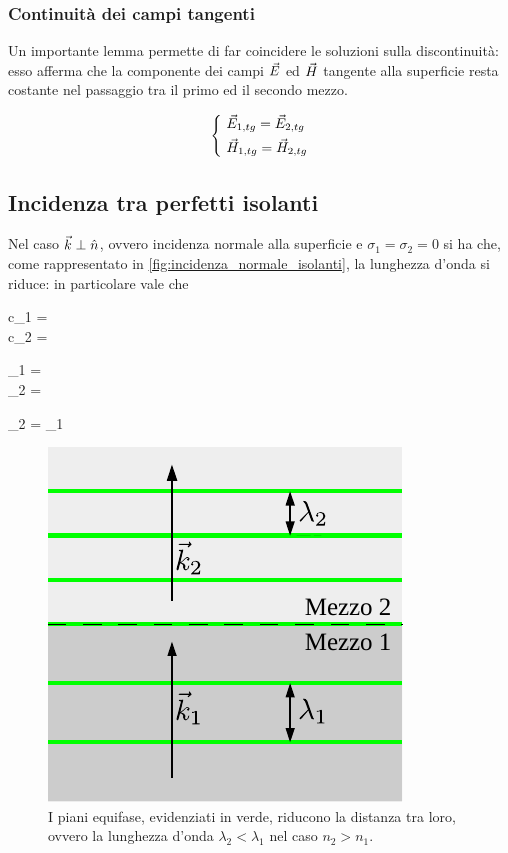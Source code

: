 \subsubsection{Continuità dei campi tangenti}
Un importante lemma permette di far coincidere le soluzioni sulla discontinuità: esso afferma che la componente dei campi $\vec{E}$ ed $\vec{H}$ tangente alla superficie resta costante nel passaggio tra il primo ed il secondo mezzo.

\begin{equation}
	\begin{dcases}
		~ \vec{E}_{1, tg} = \vec{E}_{2, tg} \\
		~ \vec{H}_{1, tg} = \vec{H}_{2, tg}
	\end{dcases}
\end{equation}

\subsection{Incidenza tra perfetti isolanti}
	Nel caso $\vec{k} \perp \hat{n}$, ovvero incidenza normale alla superficie e $\sigma_1 = \sigma_2 = 0$ si ha che, come rappresentato in \autoref{fig:incidenza_normale_isolanti}, la lunghezza d'onda si riduce: in particolare vale che

	\begin{esp}
		\begin{dcases}
			c_1 =  \\
			c_2 = 
		\end{dcases}
		\implies
		\begin{dcases}
			\lambda_1 = \frac{\lambda_{_{0}}}{n_1} \\
			\lambda_2 = \frac{\lambda_{_{0}}}{n_2}
		\end{dcases}
		\implies
		\lambda_2 = \lambda_1 
	\end{esp}

	\begin{figure}[ht]
		\centering
		\includegraphics{img/incidenza_normale.pdf}
		\caption{I piani equifase, evidenziati in verde, riducono la distanza tra loro, ovvero la lunghezza d'onda $\lambda_2 < \lambda_1$ nel caso $n_2 > n_1$.}
		\label{fig:incidenza_normale_isolanti}
	\end{figure}

